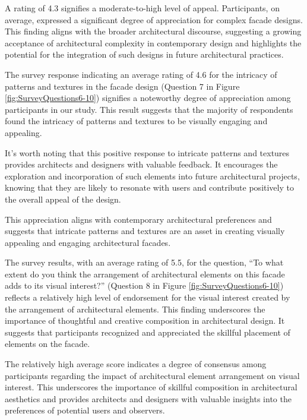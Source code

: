 A rating of 4.3 signifies a moderate-to-high level of appeal.
Participants, on average, expressed a significant degree of appreciation for complex facade designs.
This finding aligns with the broader architectural discourse, suggesting a growing acceptance of architectural complexity in contemporary design and highlights the potential for the integration of such designs in future architectural practices.


The survey response indicating an average rating of 4.6 for the intricacy of patterns and textures in the facade design (Question 7 in Figure \ref{fig:SurveyQuestions6-10}) signifies a noteworthy degree of appreciation among participants in our study.
This result suggests that the majority of respondents found the intricacy of patterns and textures to be visually engaging and appealing.

It's worth noting that this positive response to intricate patterns and textures provides architects and designers with valuable feedback.
It encourages the exploration and incorporation of such elements into future architectural projects, knowing that they are likely to resonate with users and contribute positively to the overall appeal of the design.

This appreciation aligns with contemporary architectural preferences and suggests that intricate patterns and textures are an asset in creating visually appealing and engaging architectural facades.


The survey results, with an average rating of 5.5, for the question, ``To what extent do you think the arrangement of architectural elements on this facade adds to its visual interest?'' (Question 8 in Figure \ref{fig:SurveyQuestions6-10}) reflects a relatively high level of endorsement for the visual interest created by the arrangement of architectural elements.
This finding underscores the importance of thoughtful and creative composition in architectural design.
It suggests that participants recognized and appreciated the skillful placement of elements on the facade.

The relatively high average score indicates a degree of consensus among participants regarding the impact of architectural element arrangement on visual interest.
This underscores the importance of skillful composition in architectural aesthetics and provides architects and designers with valuable insights into the preferences of potential users and observers.

